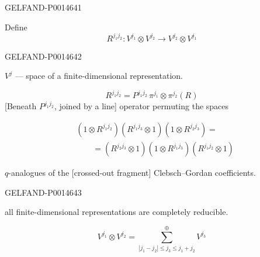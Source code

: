 \begin{GelfandAdjacentEvidence}{GELFAND-P001464}{1}

Define
\[
R^{j_1j_2}\colon V^{j_1}\otimes V^{j_2}\longrightarrow V^{j_2}\otimes V^{j_1}
\]
\end{GelfandAdjacentEvidence}
\begin{GelfandAdjacentEvidence}{GELFAND-P001464}{2}


\(V^j\) --- space of a finite-dimensional representation.

\begin{equation*}
R^{j_1j_2}=P^{j_1j_2}\,\pi^{j_1}\otimes\pi^{j_2}(R)
\tag{13}
\end{equation*}
[Beneath \(P^{j_1j_2}\), joined by a line] operator permuting the spaces

\begin{equation*}
\begin{aligned}
&(1\otimes R^{j_1j_2})(R^{j_1j_3}\otimes1)(1\otimes R^{j_2j_3})=\\
&\qquad=(R^{j_2j_3}\otimes1)(1\otimes R^{j_1j_3})(R^{j_1j_2}\otimes1)
\end{aligned}
\tag{14}
\end{equation*}

\(q\)-analogues of the [crossed-out fragment] Clebsch–Gordan coefficients.
\end{GelfandAdjacentEvidence}
\begin{GelfandAdjacentEvidence}{GELFAND-P001464}{3}


all finite-dimensional representations are completely reducible.

\begin{equation*}
V^{j_1}\otimes V^{j_2}=\sum_{|j_1-j_2|\le j_3\le j_1+j_2}^{\oplus}V^{j_3}
\tag{15}
\end{equation*}
\end{GelfandAdjacentEvidence}
